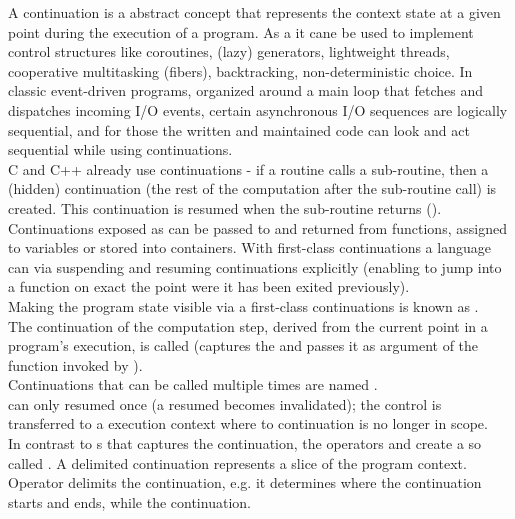 
A continuation is a abstract concept that represents the context state at a
given point during the execution of a program. As a  it cane be used to implement control structures like coroutines,
(lazy) generators, lightweight threads, cooperative multitasking (fibers),
backtracking, non-deterministic choice. In classic event-driven programs,
organized around a main loop that fetches and dispatches incoming I/O events,
certain asynchronous I/O sequences are logically sequential, and for those the
written and maintained code can look and act sequential while using
continuations.\\

C and C++ already use continuations - if a routine calls a sub-routine, then a
(hidden) continuation (the rest of the computation after the sub-routine call)
is created. This continuation is resumed when the sub-routine returns
().\\

Continuations exposed as  can be passed to and
returned from functions, assigned to variables or stored into containers. With
first-class continuations a language can 
via suspending and resuming continuations explicitly (enabling to jump into a
function on exact the point were it has been exited previously).\\
Making the program state visible via a first-class continuations is known as
.\\

The continuation of the computation step, derived from the current point in a
program's execution, is called  (\cc captures the
 and passes it as argument of the function invoked by
\cc).\\

Continuations that can be called multiple times are named
.\\
 can only resumed once (a resumed 
 becomes invalidated); the control is transferred to
a execution context where to continuation is no longer in scope.\\

In contrast to s \cc that captures the  continuation, the
operators \shift and \reset create a so called . A
delimited continuation represents a slice of the program context. Operator
\reset delimits the continuation, e.g. it determines where the continuation
starts and ends, while \shift {} the continuation.
